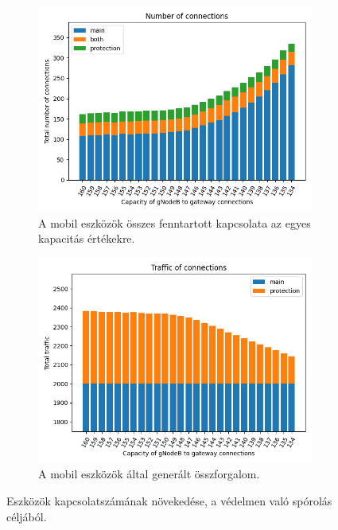 \documentclass[a4paper,oneside]{article}
\begin{document}
\begin{figure}[h]
  \begin{subfigure}[t]{0.5\textwidth}
    \includegraphics[width=\textwidth]{number_of_connections.png}
    \caption{
      A mobil eszközök összes fenntartott kapcsolata az egyes kapacitás értékekre.
    } \label{fig:2.3a}
  \end{subfigure}
  \begin{subfigure}[t]{0.5\textwidth}
    \includegraphics[width=\textwidth]{traffic_of_connections.png}
    \caption{
      A mobil eszközök által generált összforgalom.
    } \label{fig:2.3b}
  \end{subfigure}
  \caption{Eszközök kapcsolatszámának növekedése, a védelmen való spórolás céljából.}
  \label{fig:2.3}
\end{figure}
\end{document}
